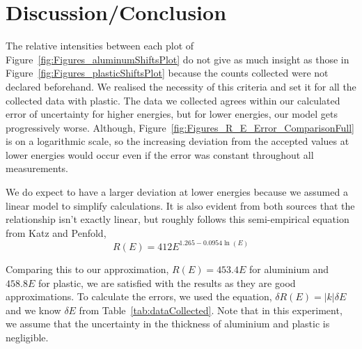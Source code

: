 


\section{Discussion/Conclusion}

\label{sec:discussion_conclusion} The relative intensities between each plot of Figure~\ref{fig:Figures_aluminumShiftsPlot} do not give as much insight as those in Figure~\ref{fig:Figures_plasticShiftsPlot} because the counts collected were not declared beforehand. We realised the necessity of this criteria and set it for all the collected data with plastic. The data we collected agrees within our calculated error of uncertainty for higher energies, but for lower energies, our model gets progressively worse. Although, Figure~\ref{fig:Figures_R_E_Error_ComparisonFull} is on a logarithmic scale, so the increasing deviation from the accepted values at lower energies would occur even if the error was constant throughout all measurements. 

We do expect to have a larger deviation at lower energies because we assumed a linear model to simplify calculations. It is also evident from both sources that the relationship isn't exactly linear, but roughly follows this semi-empirical equation from Katz and Penfold,\cite{RevModPhys.24.28} 
\begin{equation}
	R(E) = 412 E^{1.265 - 0.0954 \ln(E)} \label{eq:acceptedEq} 
\end{equation}

Comparing this to our approximation, $R(E) = 453.4 E$ for aluminium and $458.8 E$ for plastic, we are satisfied with the results as they are good approximations.   To calculate the errors, we used the equation,\cite{093570275X} $\delta R(E) = |k| \delta E$ and we know $\delta E$ from Table~\ref{tab:dataCollected}. Note that in this experiment, we assume that the uncertainty in the thickness of aluminium and plastic is negligible. 


